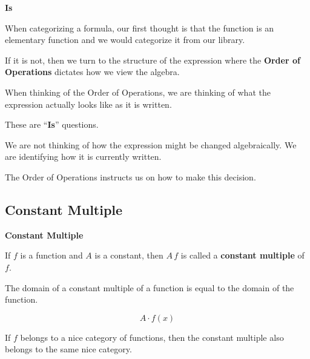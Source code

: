 \documentclass{ximera}
\begin{document}
\begin{warning}  \textbf{\textcolor{red!70!black}{Is}}


When categorizing a formula, our first thought is that the function is an elementary function and we would categorize it from our library. 

If it is not, then we turn to the structure of the expression where the \textbf{Order of Operations} dictates how we view the algebra. 

When thinking of the Order of Operations, we are thinking of what the expression actually looks like as it is written.


\begin{center}
These are ``\textbf{\textcolor{red!70!black}{Is}}'' questions.
\end{center}

We are not thinking of how the expression might be changed algebraically.  We are identifying how it is currently written. 

The Order of Operations instructs us on how to make this decision.

\end{warning}



\subsection*{Constant Multiple}


\begin{template}  \textbf{\textcolor{blue!55!black}{Constant Multiple}} 


If  $f$ is a function and $A$ is a constant, then $A \, f$ is called a \textbf{\textcolor{blue!55!black}{constant multiple}} of $f$. 

The domain of a constant multiple of a function is equal to the domain of the function. 


\[ A \cdot f(x)  \]



\end{template}



\begin{observation}

If $f$ belongs to a nice category of functions, then the constant multiple also belongs to the same nice category.

\end{observation}
\end{document}

